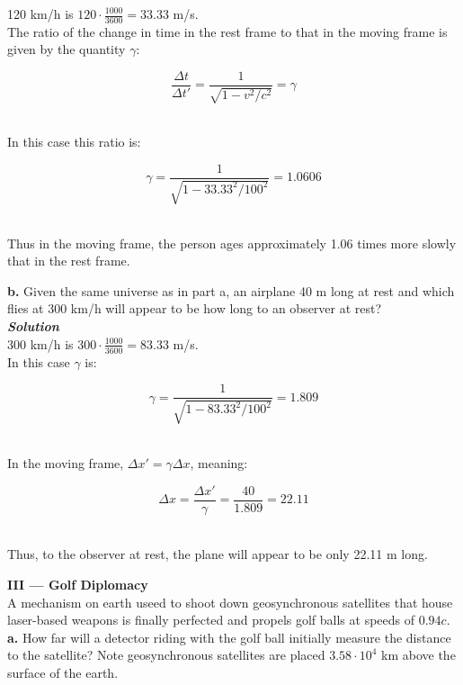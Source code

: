 \documentclass[9pt]{extarticle}
\newcommand{\bfit}[1]{\textbf{\textit{#1}}}
\begin{document}
\begin{multicols*}{2}
120 km/h is $120 \cdot \frac{1000}{3600} = 33.33$ m/s. \\ 

The ratio of the change in time in the rest frame to that in the moving frame is given by the quantity $\gamma$:

$$\frac{\Delta t}{\Delta t'} = \frac{1}{\sqrt{1-v^2/c^2}} = \gamma$$ \ 

In this case this ratio is:

$$\gamma = \frac{1}{\sqrt{1-33.33^2/100^2}} = 1.0606$$ \ 

Thus in the moving frame, the person ages approximately 1.06 times more slowly that in the rest frame. \\ 




\dotfill 

\hfill 

{\Large \bf b.} Given the same universe as in part a, an airplane 40 m long at rest and which flies at 300 km/h will appear to be how long to an observer at rest? \\ 

{\bfit{Solution}} \\ 

300 km/h is $300 \cdot \frac{1000}{3600} = 83.33$ m/s. \\ 

In this case $\gamma$ is:

$$\gamma = \frac{1}{\sqrt{1-83.33^2/100^2}} = 1.809$$ \

In the moving frame, $\Delta x' =  \gamma \Delta x$, meaning:

$$\Delta x = \frac{\Delta x'}{\gamma} = \frac{40}{1.809} = 22.11$$ \

Thus, to the observer at rest, the plane will appear to be only 22.11 m long.  





\hrulefill 

\hfill 

{\LARGE \bf III --- Golf Diplomacy} \\ 

A mechanism on earth useed to shoot down geosynchronous satellites that house laser-based weapons is finally perfected and propels golf balls at speeds of $0.94c$. \\ 

{\Large \bf a.} How far will a detector riding with the golf ball initially measure the distance to the satellite? Note geosynchronous satellites are placed $3.58 \cdot 10^4$ km  above the surface of the earth. \\ 


\end{multicols*}
\end{document}
